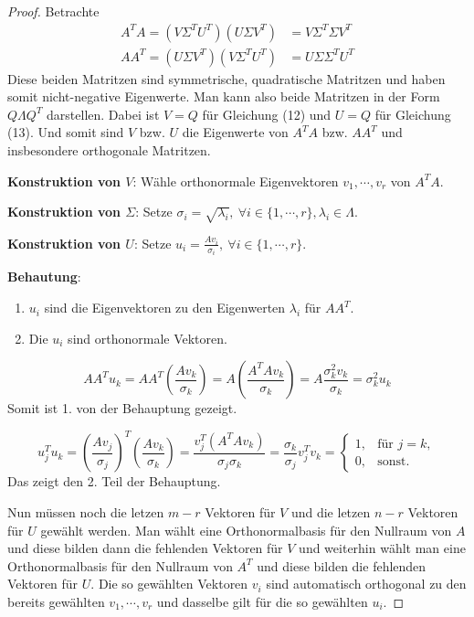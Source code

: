 \documentclass{article}
\begin{document}
\begin{proof}
    Betrachte
    \begin{align}
        A^TA = (V \Sigma^T U^T) (U \Sigma V^T) &= V \Sigma^T \Sigma V^T \\
        AA^T = (U \Sigma V^T) (V \Sigma^T U^T) &= U \Sigma \Sigma^T U^T
    \end{align}
    Diese beiden Matritzen sind symmetrische, quadratische Matritzen und haben somit
    nicht-negative Eigenwerte. Man kann also beide Matritzen in der Form $Q \Lambda Q^T$ darstellen.
    Dabei ist $V = Q$ für Gleichung (12) und $U = Q$ für Gleichung (13). Und somit sind $V$ bzw. $U$ die Eigenwerte
    von $A^TA$ bzw. $AA^T$ und insbesondere orthogonale Matritzen.

    \textbf{Konstruktion von $V$}: Wähle orthonormale Eigenvektoren $v_1, \cdots, v_r$ von $A^TA$.

    \textbf{Konstruktion von $\Sigma$}: Setze $\sigma_i = \sqrt{\lambda_i}, \: \forall i \in \{1, \cdots, r\}, \lambda_i \in \Lambda$.

    \textbf{Konstruktion von $U$}: Setze $u_i = \frac{Av_i}{\sigma_i}, \: \forall i \in \{1, \cdots, r\}$.
    
    \textbf{Behautung}: 
    \begin{enumerate}
        \item $u_i$ sind die Eigenvektoren zu den Eigenwerten $\lambda_i$ für $AA^T$.
        \item Die $u_i$ sind orthonormale Vektoren.
    \end{enumerate}
    \begin{equation*}
        AA^Tu_k = AA^T\left(\frac{Av_k}{\sigma_k}\right) = A\left(\frac{A^TAv_k}{\sigma_k}\right) = A\frac{\sigma_k^2v_k}{\sigma_k} = \sigma_k^2u_k
    \end{equation*}
    Somit ist 1. von der Behauptung gezeigt.

    \begin{equation*}
        u_j^Tu_k = \left(\frac{Av_j}{\sigma_j}\right)^T\left(\frac{Av_k}{\sigma_k}\right) = \frac{v_j^T(A^TAv_k)}{\sigma_j\sigma_k} = \frac{\sigma_k}{\sigma_j}v_j^Tv_k = \begin{cases}
            1, &\text{für } j = k,\\
            0, &\text{sonst}.
        \end{cases}
    \end{equation*}
    Das zeigt den 2. Teil der Behauptung.

    Nun müssen noch die letzen $m - r$ Vektoren für $V$ und die letzen $n - r$ Vektoren für $U$ gewählt werden.
    Man wählt eine Orthonormalbasis für den Nullraum von $A$ und diese bilden dann die fehlenden Vektoren für $V$ 
    und weiterhin wählt man eine Orthonormalbasis für den Nullraum von $A^T$ und diese bilden die fehlenden Vektoren für $U$.
    Die so gewählten Vektoren $v_i$ sind automatisch orthogonal zu den bereits gewählten $v_1, \cdots, v_r$ 
    und dasselbe gilt für die so gewählten $u_i$. 
\end{proof}
\end{document}
